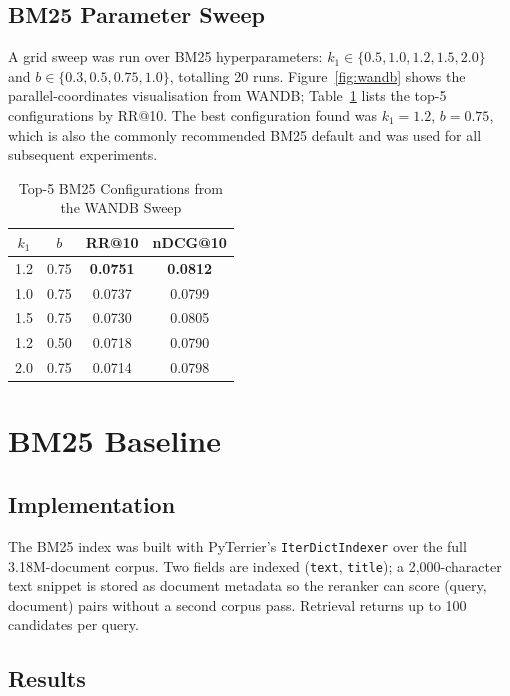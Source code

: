 \documentclass[conference]{IEEEtran}
\begin{document}
\subsection{BM25 Parameter Sweep}

A grid sweep was run over BM25 hyperparameters:
$k_1 \in \{0.5, 1.0, 1.2, 1.5, 2.0\}$ and
$b \in \{0.3, 0.5, 0.75, 1.0\}$,
totalling 20 runs.
Figure~\ref{fig:wandb} shows the parallel-coordinates visualisation from WANDB;
Table~\ref{tab:sweep} lists the top-5 configurations by RR@10.
The best configuration found was $k_1=1.2$, $b=0.75$, which is also the
commonly recommended BM25 default and was used for all subsequent experiments.

\begin{table}[t]
\caption{Top-5 BM25 Configurations from the WANDB Sweep}
\label{tab:sweep}
\centering
\begin{tabular}{cccc}
\toprule
$k_1$ & $b$ & RR@10 & nDCG@10 \\
\midrule
1.2 & 0.75 & \textbf{0.0751} & \textbf{0.0812} \\
1.0 & 0.75 & 0.0737 & 0.0799 \\
1.5 & 0.75 & 0.0730 & 0.0805 \\
1.2 & 0.50 & 0.0718 & 0.0790 \\
2.0 & 0.75 & 0.0714 & 0.0798 \\
\bottomrule
\end{tabular}
\end{table}

\section{BM25 Baseline}
\label{sec:bm25}

\subsection{Implementation}

The BM25 index was built with PyTerrier's \texttt{IterDictIndexer}
over the full 3.18M-document corpus.
Two fields are indexed (\texttt{text}, \texttt{title}); a 2{,}000-character
text snippet is stored as document metadata so the reranker can score
(query, document) pairs without a second corpus pass.
Retrieval returns up to 100 candidates per query.

\subsection{Results}
\end{document}
